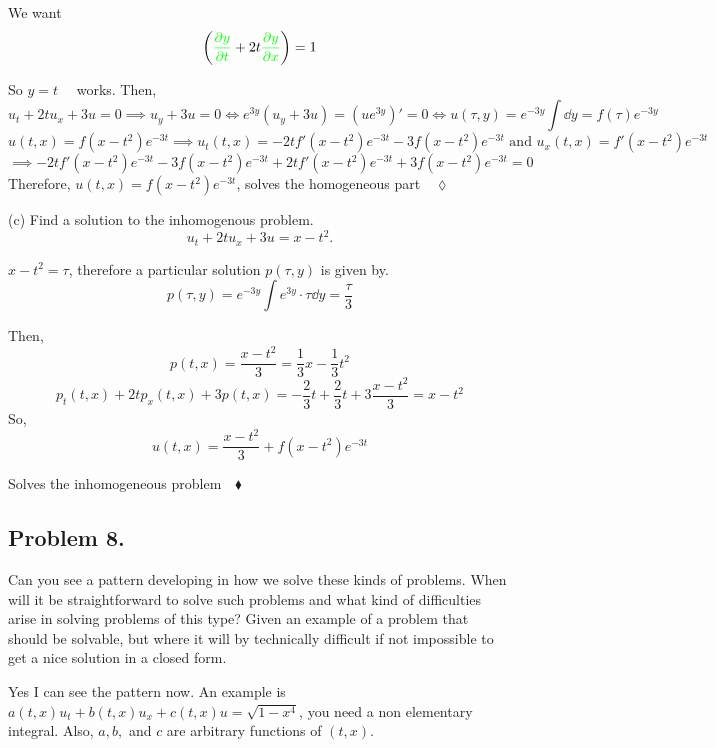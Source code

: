 \documentclass{article}
\begin{document}
We want\[\bigg( {\color{green} \pdv{y}{t}}+2t{\color{green}
    \pdv{y}{x}}\bigg) = 1\]

So $y= t\quad$ works. Then,
\[u_t +2t u_x +3u = 0\implies u_y +3u = 0 \iff e^{3y}(u_y +3u) =
  (ue^{3y})'  = 0\iff u(\tau,y) = e^{-3y}\int \dd{y}  = f(\tau)e^{-3y}\]
\[u(t,x) = f(x-t^2)e^{-3t} \implies u_t(t,x) =
  -2tf'(x-t^2)e^{-3t}-3f(x-t^2)e^{-3t}\text{ and }u_x(t,x) =
  f'(x-t^2)e^{-3t}\]
\[\implies -2tf'(x-t^2)e^{-3t}-3f(x-t^2)e^{-3t} +2t f'(x-t^2)e^{-3t}
  +3f(x-t^2)e^{-3t} = 0\]
Therefore, $u(t,x) = f(x-t^2)e^{-3t}$, solves the homogeneous
part$\quad \lozenge$

(c) Find a solution to the inhomogenous problem.
\[u_t +2tu_x +3u = x-t^2.\]

$x-t^2 = \tau$, therefore a particular solution $p(\tau,y)$ is given by.
\[p(\tau,y) = e^{-3y}\int e^{3y}\cdot\tau \dd{y}  = \frac{\tau}{3}\]

Then, \[p(t,x) = \frac{x-t^2}{3} = \frac{1}{3}x -\frac{1}{3}t^2\]
\[p_t(t,x) +2tp_x(t,x) +3 p(t,x)= -\frac{2}{3}t +\frac{2}{3}t +
  3\frac{x-t^2}{3} = x-t^2\]
So, \[u(t,x) = \frac{x-t^2}{3} + f(x-t^2)e^{-3t} \]

Solves the inhomogeneous problem$\quad \blacklozenge$
\subsection*{Problem 8.}Can you see a pattern developing in how we solve these kinds of problems. When
will it be straightforward to solve such problems and what kind of difficulties arise in solving
problems of this type? Given an example of a problem that should be solvable, but where it
will by technically difficult if not impossible to get a nice solution
in a closed form.

Yes I can see the pattern now. An example is $a(t,x)u_t +b(t,x)u_x
+c(t,x)u = \sqrt{1-x^4}$, you need a non elementary integral. Also,
$a,b,$ and $c$ are arbitrary functions of $(t,x)$.
\end{document}
